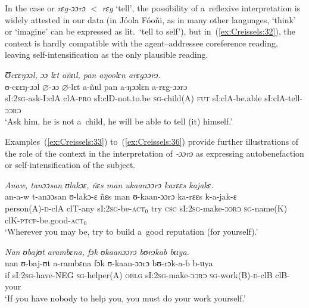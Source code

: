 \documentclass[output=paper]{langscibook}
\begin{document}
  \z
\z

In the case or \textit{rɛg-ɔɔrɔ} $<$ \textit{rɛg} `tell', the possibility of
a~reflexive interpretation is widely attested in our data (in Jóola Fóoñi, as
in many other languages, `think' or `imagine' can be expressed as lit.\ `tell
to self'), but in~(\ref{ex:Creissels:32}), the context is hardly compatible with the
agent--addressee coreference reading, leaving self-intensification as the only
plausible reading.

\ea
  \label{ex:Creissels:32}
  
    \textit{Ʊcɛɛŋɔɔl, ɔɔ lɛt añɩɩl, pan aŋoolɛn arɛgɔɔrɔ.}\\
    \gll ʊ-cɛɛŋ-ɔɔl $\varnothing$-ɔɔ $\varnothing$-lɛt a-ñɩɩl pan a-ŋɔɔlɛn a-rɛg-ɔɔrɔ\\
    sI:\textsc{2sg}-ask-I:clA clA-\textsc{pro} sI:clD-not.to.be \textsc{sg}-child(A)
    \textsc{fut} sI:clA-be.able sI:clA-tell-\textsc{ɔɔrɔ}\\
    \glt `Ask him, he is not a~child, he will be able to tell (it) himself.'

\z

Examples~(\ref{ex:Creissels:33}) to~(\ref{ex:Creissels:36}) provide further illustrations
of the role of the context in the interpretation of \textit{‑ɔɔrɔ} as expressing
autobenefaction or self-intensification of the subject.

\ea
  \label{ex:Creissels:33}
  
    \ea\label{ex:Creissels:33a}
    
      \textit{Anaw, tanɔɔsan ʊlakɔɛ, ñɛs man ukaanɔɔrɔ karɛɛs kajakɛ.}\\
      \gll an-a-w t-anɔɔsan ʊ-lakɔ-ɛ ñɛs man ʊ-kaan-ɔɔrɔ ka-rɛɛs k-a-jak-ɛ\\
      person(A)-\textsc{d}-clA clT-any sI:\textsc{2sg}-be-\textsc{act$_0$} try
      \textsc{csc} sI:\textsc{2sg}-make-\textsc{ɔɔrɔ} \textsc{sg}-name(K)
      clK-\textsc{ptcp}-be.good-\textsc{act$_0$}\\
      \glt `Wherever you may be, try to build a~good reputation (for yourself).'


    \ex\label{ex:Creissels:33b}
    
      \textit{Nan ʊbajʊt arambɛna, fɔk ʊkaanɔɔrɔ bʊrɔkab bɩɩya.}\\
      \gll nan ʊ-baj-ʊt a-rambɛna fɔk ʊ-kaan-ɔɔrɔ bʊ-rɔk-a-b b-ɩɩya\\
      if sI:\textsc{2sg}-have-\textsc{NEG} \textsc{sg}-helper(A) \textsc{oblg}
      sI:\textsc{2sg}-make-\textsc{ɔɔrɔ} \textsc{sg}-work(B)-\textsc{d}-clB clB-your\\
      \glt `If you have nobody to help you, you must do your work yourself.'
\end{document}
